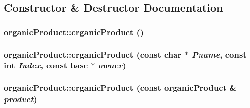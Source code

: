 \subsection{Constructor \& Destructor Documentation}
\hypertarget{classorganic_product_a9442aaacbeb8c6ece232b009e8849f11}{
\subsubsection[{organicProduct}]{\setlength{\rightskip}{0pt plus 5cm}organicProduct::organicProduct ()}}
\label{classorganic_product_a9442aaacbeb8c6ece232b009e8849f11}
\hypertarget{classorganic_product_a7f742dabf4d9dcfa12a14510a4d9e315}{
\subsubsection[{organicProduct}]{\setlength{\rightskip}{0pt plus 5cm}organicProduct::organicProduct (const char $\ast$ {\em Pname}, \/  const int {\em Index}, \/  const {\bf base} $\ast$ {\em owner})}}
\label{classorganic_product_a7f742dabf4d9dcfa12a14510a4d9e315}
\hypertarget{classorganic_product_aefc7ff5ac707cd2d3f06b8a68267c6f1}{
\subsubsection[{organicProduct}]{\setlength{\rightskip}{0pt plus 5cm}organicProduct::organicProduct (const {\bf organicProduct} \& {\em product})}}
\label{classorganic_product_aefc7ff5ac707cd2d3f06b8a68267c6f1}


